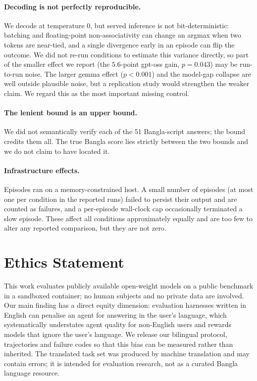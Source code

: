 \documentclass[11pt]{article}
\begin{document}
\paragraph{Decoding is not perfectly reproducible.} We decode at temperature $0$, but served
inference is not bit-deterministic: batching and floating-point non-associativity can change an
argmax when two tokens are near-tied, and a single divergence early in an episode can flip the
outcome. We did not re-run conditions to estimate this variance directly, so part of the smaller
effect we report (the $5.6$-point gpt-oss gain, $p=0.043$) may be run-to-run noise. The larger
gemma effect ($p<0.001$) and the model-gap collapse are well outside plausible noise, but a
replication study would strengthen the weaker claim. We regard this as the most important
missing control.

\paragraph{The lenient bound is an upper bound.} We did not semantically verify each of the 51
Bangla-script answers; the bound credits them all. The true Bangla score lies strictly between
the two bounds and we do not claim to have located it.

\paragraph{Infrastructure effects.} Episodes ran on a memory-constrained host. A small number of
episodes (at most one per condition in the reported runs) failed to persist their output and are
counted as failures, and a per-episode wall-clock cap occasionally terminated a slow episode.
These affect all conditions approximately equally and are too few to alter any reported
comparison, but they are not zero.

\section*{Ethics Statement}

This work evaluates publicly available open-weight models on a public benchmark in a sandboxed
container; no human subjects and no private data are involved. Our main finding has a direct
equity dimension: evaluation harnesses written in English can penalise an agent for answering in
the user's language, which systematically understates agent quality for non-English users and
rewards models that ignore the user's language. We release our bilingual protocol, trajectories
and failure codes so that this bias can be measured rather than inherited. The translated task
set was produced by machine translation and may contain errors; it is intended for evaluation
research, not as a curated Bangla language resource.
\end{document}
